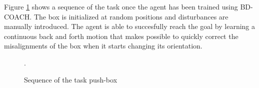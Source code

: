 Figure \ref{fig:sequence-push-box} shows a sequence of the task once the agent has been trained using BD-COACH. The box is initialized at random positions and disturbances are manually introduced. The agent is able to succesfully reach the goal by learning a continuous back and forth motion that makes possible to quickly correct the misalignments of the box when it starts changing its orientation.

 \begin{figure}[H]
  \centering
   \hfill
   \hfill
   \hfill
   \hfill
  \caption{Sequence of the task push-box}.
  \label{fig:sequence-push-box}
\end{figure}







